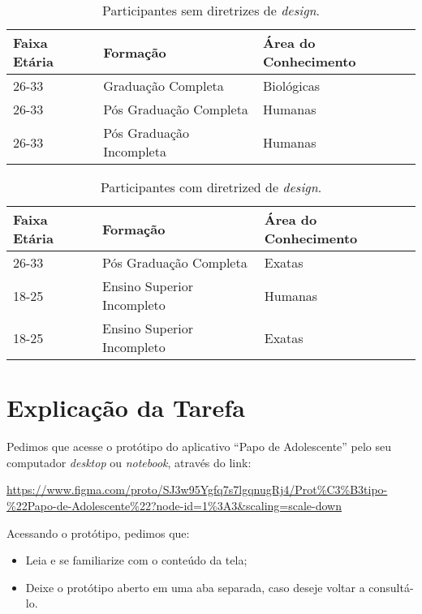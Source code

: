 \documentclass[12pt]{article}
\begin{document}
\begin{table}[!htb]
  \centering
	\begin{tabular}{|l|l|l|}
		\hline
		\textbf{Faixa Etária} & \textbf{Formação} & \textbf{Área do Conhecimento} \\ \hline
		26-33 & Graduação Completa & Biológicas \\ \hline
		26-33 & Pós Graduação Completa & Humanas \\ \hline
		26-33 & Pós Graduação Incompleta & Humanas \\ \hline
		\end{tabular}
  \caption{Participantes sem diretrizes de \textit{design}.}
  \label{tab:no_guidelines}
\end{table}

\begin{table}[!htb]
  \centering
	\begin{tabular}{|l|l|l|}
		\hline
		\textbf{Faixa Etária} & \textbf{Formação} & \textbf{Área do Conhecimento} \\ \hline
		26-33 & Pós Graduação Completa & Exatas \\ \hline
		18-25 & Ensino Superior Incompleto & Humanas \\ \hline
		18-25 & Ensino Superior Incompleto & Exatas \\ \hline
		\end{tabular}
  \caption{Participantes com diretrized de \textit{design}.}
  \label{tab:guidelines}
\end{table}

\section{Explicação da Tarefa}
\label{ap:explicacao}

Pedimos que acesse o protótipo do aplicativo ``Papo de Adolescente'' pelo seu computador \textit{desktop} ou \textit{notebook}, através do link:

\url{https://www.figma.com/proto/SJ3w95Ygfq7s7lgqnugRj4/Prot%C3%B3tipo-%22Papo-de-Adolescente%22?node-id=1%3A3&scaling=scale-down}

Acessando o protótipo, pedimos que:

\begin{itemize}
	\item Leia e se familiarize com o conteúdo da tela;
	\item Deixe o protótipo aberto em uma aba separada, caso deseje voltar a consultá-lo.
\end{itemize}
\end{document}
